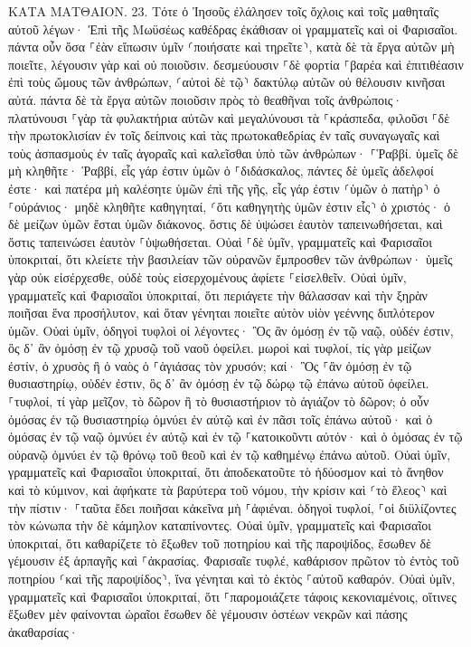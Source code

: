 \documentclass[twoside, 9pt]{extreport}
\begin{document}
ΚΑΤΑ ΜΑΤΘΑΙΟΝ.
23.
Τότε ὁ Ἰησοῦς ἐλάλησεν τοῖς ὄχλοις καὶ τοῖς μαθηταῖς αὐτοῦ 
λέγων· Ἐπὶ τῆς Μωϋσέως καθέδρας ἐκάθισαν οἱ γραμματεῖς καὶ οἱ Φαρισαῖοι. 
πάντα οὖν ὅσα ⸀ἐὰν εἴπωσιν ὑμῖν ⸂ποιήσατε καὶ τηρεῖτε⸃, κατὰ δὲ τὰ ἔργα αὐτῶν μὴ ποιεῖτε, λέγουσιν γὰρ καὶ οὐ ποιοῦσιν. 
δεσμεύουσιν ⸀δὲ φορτία ⸀βαρέα καὶ ἐπιτιθέασιν ἐπὶ τοὺς ὤμους τῶν ἀνθρώπων, ⸂αὐτοὶ δὲ τῷ⸃ δακτύλῳ αὐτῶν οὐ θέλουσιν κινῆσαι αὐτά. 
πάντα δὲ τὰ ἔργα αὐτῶν ποιοῦσιν πρὸς τὸ θεαθῆναι τοῖς ἀνθρώποις· πλατύνουσι ⸀γὰρ τὰ φυλακτήρια αὐτῶν καὶ μεγαλύνουσι τὰ ⸀κράσπεδα, 
φιλοῦσι ⸀δὲ τὴν πρωτοκλισίαν ἐν τοῖς δείπνοις καὶ τὰς πρωτοκαθεδρίας ἐν ταῖς συναγωγαῖς 
καὶ τοὺς ἀσπασμοὺς ἐν ταῖς ἀγοραῖς καὶ καλεῖσθαι ὑπὸ τῶν ἀνθρώπων· ⸀Ῥαββί. 
ὑμεῖς δὲ μὴ κληθῆτε· Ῥαββί, εἷς γάρ ἐστιν ὑμῶν ὁ ⸀διδάσκαλος, πάντες δὲ ὑμεῖς ἀδελφοί ἐστε· 
καὶ πατέρα μὴ καλέσητε ὑμῶν ἐπὶ τῆς γῆς, εἷς γάρ ἐστιν ⸂ὑμῶν ὁ πατὴρ⸃ ὁ ⸀οὐράνιος· 
μηδὲ κληθῆτε καθηγηταί, ⸂ὅτι καθηγητὴς ὑμῶν ἐστιν εἷς⸃ ὁ χριστός· 
ὁ δὲ μείζων ὑμῶν ἔσται ὑμῶν διάκονος. 
ὅστις δὲ ὑψώσει ἑαυτὸν ταπεινωθήσεται, καὶ ὅστις ταπεινώσει ἑαυτὸν ⸀ὑψωθήσεται. 
Οὐαὶ ⸀δὲ ὑμῖν, γραμματεῖς καὶ Φαρισαῖοι ὑποκριταί, ὅτι κλείετε τὴν βασιλείαν τῶν οὐρανῶν ἔμπροσθεν τῶν ἀνθρώπων· ὑμεῖς γὰρ οὐκ εἰσέρχεσθε, οὐδὲ τοὺς εἰσερχομένους ἀφίετε ⸀εἰσελθεῖν. 
Οὐαὶ ὑμῖν, γραμματεῖς καὶ Φαρισαῖοι ὑποκριταί, ὅτι περιάγετε τὴν θάλασσαν καὶ τὴν ξηρὰν ποιῆσαι ἕνα προσήλυτον, καὶ ὅταν γένηται ποιεῖτε αὐτὸν υἱὸν γεέννης διπλότερον ὑμῶν. 
Οὐαὶ ὑμῖν, ὁδηγοὶ τυφλοὶ οἱ λέγοντες· Ὃς ἂν ὀμόσῃ ἐν τῷ ναῷ, οὐδέν ἐστιν, ὃς δ᾽ ἂν ὀμόσῃ ἐν τῷ χρυσῷ τοῦ ναοῦ ὀφείλει. 
μωροὶ καὶ τυφλοί, τίς γὰρ μείζων ἐστίν, ὁ χρυσὸς ἢ ὁ ναὸς ὁ ⸀ἁγιάσας τὸν χρυσόν; 
καί· Ὃς ⸀ἂν ὀμόσῃ ἐν τῷ θυσιαστηρίῳ, οὐδέν ἐστιν, ὃς δ᾽ ἂν ὀμόσῃ ἐν τῷ δώρῳ τῷ ἐπάνω αὐτοῦ ὀφείλει. 
⸀τυφλοί, τί γὰρ μεῖζον, τὸ δῶρον ἢ τὸ θυσιαστήριον τὸ ἁγιάζον τὸ δῶρον; 
ὁ οὖν ὀμόσας ἐν τῷ θυσιαστηρίῳ ὀμνύει ἐν αὐτῷ καὶ ἐν πᾶσι τοῖς ἐπάνω αὐτοῦ· 
καὶ ὁ ὀμόσας ἐν τῷ ναῷ ὀμνύει ἐν αὐτῷ καὶ ἐν τῷ ⸀κατοικοῦντι αὐτόν· 
καὶ ὁ ὀμόσας ἐν τῷ οὐρανῷ ὀμνύει ἐν τῷ θρόνῳ τοῦ θεοῦ καὶ ἐν τῷ καθημένῳ ἐπάνω αὐτοῦ. 
Οὐαὶ ὑμῖν, γραμματεῖς καὶ Φαρισαῖοι ὑποκριταί, ὅτι ἀποδεκατοῦτε τὸ ἡδύοσμον καὶ τὸ ἄνηθον καὶ τὸ κύμινον, καὶ ἀφήκατε τὰ βαρύτερα τοῦ νόμου, τὴν κρίσιν καὶ ⸂τὸ ἔλεος⸃ καὶ τὴν πίστιν· ⸀ταῦτα ἔδει ποιῆσαι κἀκεῖνα μὴ ⸀ἀφιέναι. 
ὁδηγοὶ τυφλοί, ⸀οἱ διϋλίζοντες τὸν κώνωπα τὴν δὲ κάμηλον καταπίνοντες. 
Οὐαὶ ὑμῖν, γραμματεῖς καὶ Φαρισαῖοι ὑποκριταί, ὅτι καθαρίζετε τὸ ἔξωθεν τοῦ ποτηρίου καὶ τῆς παροψίδος, ἔσωθεν δὲ γέμουσιν ἐξ ἁρπαγῆς καὶ ⸀ἀκρασίας. 
Φαρισαῖε τυφλέ, καθάρισον πρῶτον τὸ ἐντὸς τοῦ ποτηρίου ⸂καὶ τῆς παροψίδος⸃, ἵνα γένηται καὶ τὸ ἐκτὸς ⸀αὐτοῦ καθαρόν. 
Οὐαὶ ὑμῖν, γραμματεῖς καὶ Φαρισαῖοι ὑποκριταί, ὅτι ⸀παρομοιάζετε τάφοις κεκονιαμένοις, οἵτινες ἔξωθεν μὲν φαίνονται ὡραῖοι ἔσωθεν δὲ γέμουσιν ὀστέων νεκρῶν καὶ πάσης ἀκαθαρσίας· 
\end{document}
